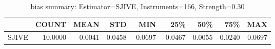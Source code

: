 \begin{table}[ht]
\centering
\caption{bias summary: Estimator=SJIVE, Instruments=166, Strength=0.30}
\begin{tabular}{lrrrrrrrr}
\toprule
 & COUNT & MEAN & STD & MIN & 25\% & 50\% & 75\% & MAX \\
\midrule
SJIVE & 10.0000 & -0.0041 & 0.0458 & -0.0697 & -0.0467 & 0.0055 & 0.0240 & 0.0697 \\
\bottomrule
\end{tabular}
\end{table}
